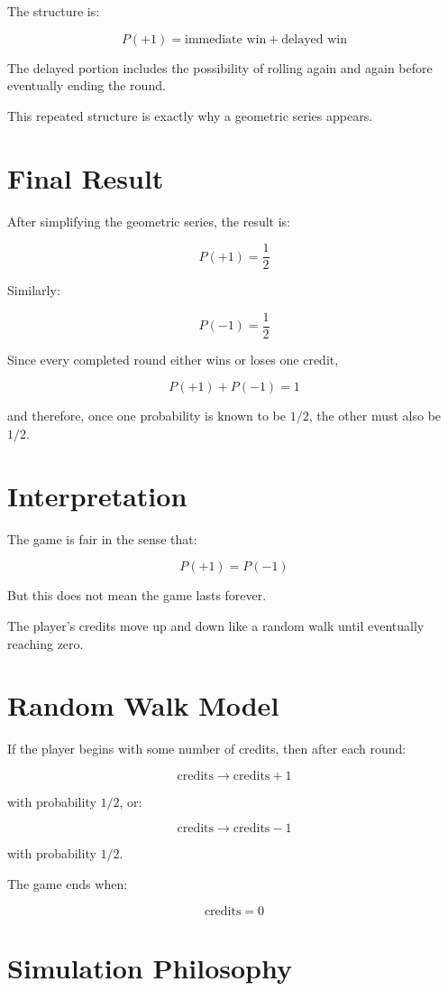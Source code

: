 \documentclass[11pt]{article}
\begin{document}
The structure is:

\[
P(+1) = \text{immediate win} + \text{delayed win}
\]

The delayed portion includes the possibility of rolling again and again before eventually ending the round.

This repeated structure is exactly why a geometric series appears.

\section{Final Result}

After simplifying the geometric series, the result is:

\[
P(+1) = \frac{1}{2}
\]

Similarly:

\[
P(-1) = \frac{1}{2}
\]

Since every completed round either wins or loses one credit,

\[
P(+1) + P(-1) = 1
\]

and therefore, once one probability is known to be \(1/2\), the other must also be \(1/2\).

\section{Interpretation}

The game is fair in the sense that:

\[
P(+1) = P(-1)
\]

But this does not mean the game lasts forever.

The player's credits move up and down like a random walk until eventually reaching zero.

\section{Random Walk Model}

If the player begins with some number of credits, then after each round:

\[
\text{credits} \rightarrow \text{credits} + 1
\]

with probability \(1/2\), or:

\[
\text{credits} \rightarrow \text{credits} - 1
\]

with probability \(1/2\).

The game ends when:

\[
\text{credits} = 0
\]

\section{Simulation Philosophy}
\end{document}

